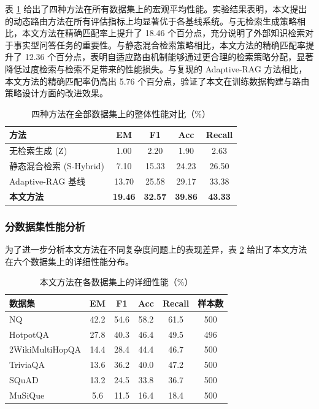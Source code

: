 表 \ref{tab:overall_comparison} 给出了四种方法在所有数据集上的宏观平均性能。实验结果表明，本文提出的动态路由方法在所有评估指标上均显著优于各基线系统。与无检索生成策略相比，本文方法在精确匹配率上提升了 18.46 个百分点，充分说明了外部知识检索对于事实型问答任务的重要性。与静态混合检索策略相比，本文方法的精确匹配率提升了 12.36 个百分点，表明自适应路由机制能够通过更合理的检索策略分配，显著降低过度检索与检索不足带来的性能损失。与复现的 Adaptive-RAG 方法相比，本文方法的精确匹配率仍高出 5.76 个百分点，验证了本文在训练数据构建与路由策略设计方面的改进效果。

\begin{table}[htbp]
    \centering
    \caption{四种方法在全部数据集上的整体性能对比（\%）}
    \label{tab:overall_comparison}
    \renewcommand{\arraystretch}{1.3}
    \begin{tabular}{l c c c c}
        \toprule
        \textbf{方法} & \textbf{EM} & \textbf{F1} & \textbf{Acc} & \textbf{Recall} \\
        \midrule
        无检索生成 (Z) & 1.00 & 2.20 & 1.90 & 2.63 \\
        静态混合检索 (S-Hybrid) & 7.10 & 15.33 & 24.23 & 26.50 \\
        Adaptive-RAG 基线 & 13.70 & 25.58 & 29.17 & 33.38 \\
        \textbf{本文方法} & \textbf{19.46} & \textbf{32.57} & \textbf{39.86} & \textbf{43.33} \\
        \bottomrule
    \end{tabular}
\end{table}

\subsubsection{分数据集性能分析}

为了进一步分析本文方法在不同复杂度问题上的表现差异，表 \ref{tab:proposed_per_dataset} 给出了本文方法在六个数据集上的详细性能分布。

\begin{table}[htbp]
    \centering
    \caption{本文方法在各数据集上的详细性能（\%）}
    \label{tab:proposed_per_dataset}
    \renewcommand{\arraystretch}{1.3}
    \begin{tabular}{l c c c c c}
        \toprule
        \textbf{数据集} & \textbf{EM} & \textbf{F1} & \textbf{Acc} & \textbf{Recall} & \textbf{样本数} \\
        \midrule
        NQ & 42.2 & 54.6 & 58.2 & 61.5 & 500 \\
        HotpotQA & 27.8 & 40.3 & 46.4 & 49.5 & 496 \\
        2WikiMultiHopQA & 14.4 & 28.4 & 44.4 & 46.7 & 500 \\
        TriviaQA & 13.6 & 36.2 & 40.0 & 47.2 & 500 \\
        SQuAD & 13.2 & 24.5 & 33.8 & 36.7 & 500 \\
        MuSiQue & 5.6 & 11.5 & 16.4 & 18.4 & 500 \\
        \bottomrule
    \end{tabular}
\end{table}

